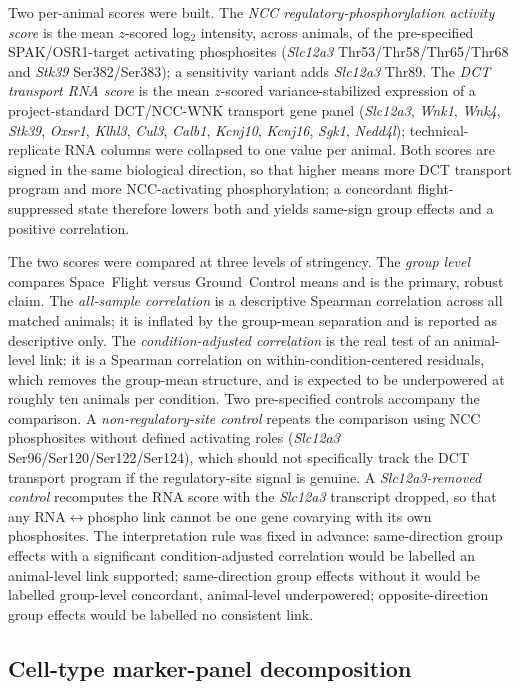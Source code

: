 \documentclass[11pt]{article}
\newcommand{\gene}[1]{\textit{#1}}
\begin{document}
Two per-animal scores were built. The \emph{NCC regulatory-phosphorylation activity score} is the mean $z$-scored log$_2$ intensity, across animals, of the pre-specified SPAK/OSR1-target activating phosphosites (\gene{Slc12a3} Thr53/Thr58/Thr65/Thr68 and \gene{Stk39} Ser382/Ser383); a sensitivity variant adds \gene{Slc12a3} Thr89. The \emph{DCT transport RNA score} is the mean $z$-scored variance-stabilized expression of a project-standard DCT/NCC-WNK transport gene panel (\gene{Slc12a3}, \gene{Wnk1}, \gene{Wnk4}, \gene{Stk39}, \gene{Oxsr1}, \gene{Klhl3}, \gene{Cul3}, \gene{Calb1}, \gene{Kcnj10}, \gene{Kcnj16}, \gene{Sgk1}, \gene{Nedd4l}); technical-replicate RNA columns were collapsed to one value per animal. Both scores are signed in the same biological direction, so that higher means more DCT transport program and more NCC-activating phosphorylation; a concordant flight-suppressed state therefore lowers both and yields same-sign group effects and a positive correlation.

The two scores were compared at three levels of stringency. The \emph{group level} compares Space~Flight versus Ground~Control means and is the primary, robust claim. The \emph{all-sample correlation} is a descriptive Spearman correlation across all matched animals; it is inflated by the group-mean separation and is reported as descriptive only. The \emph{condition-adjusted correlation} is the real test of an animal-level link: it is a Spearman correlation on within-condition-centered residuals, which removes the group-mean structure, and is expected to be underpowered at roughly ten animals per condition. Two pre-specified controls accompany the comparison. A \emph{non-regulatory-site control} repeats the comparison using NCC phosphosites without defined activating roles (\gene{Slc12a3} Ser96/Ser120/Ser122/Ser124), which should not specifically track the DCT transport program if the regulatory-site signal is genuine. A \emph{Slc12a3-removed control} recomputes the RNA score with the \gene{Slc12a3} transcript dropped, so that any RNA$\leftrightarrow$phospho link cannot be one gene covarying with its own phosphosites. The interpretation rule was fixed in advance: same-direction group effects with a significant condition-adjusted correlation would be labelled an animal-level link supported; same-direction group effects without it would be labelled group-level concordant, animal-level underpowered; opposite-direction group effects would be labelled no consistent link.

\subsection{Cell-type marker-panel decomposition}
\end{document}
